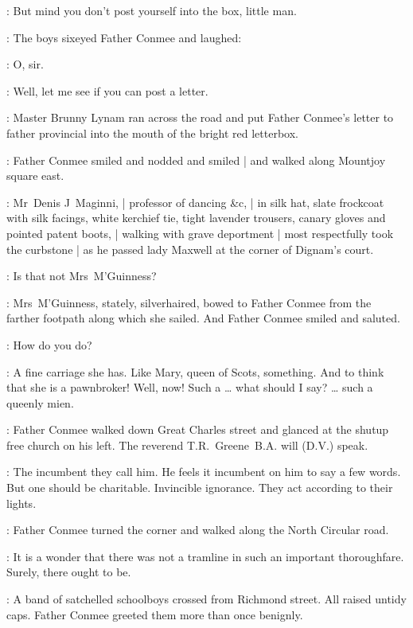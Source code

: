 \conmee:
But mind you don't post yourself into the box, little man.

:
The boys sixeyed Father Conmee and laughed:

\Boys:
O, sir.%

\conmee:
Well, let me see if you can post a letter.

:
Master Brunny Lynam ran across the road
and put Father Conmee's letter to father provincial
into the mouth of the bright red letterbox.

:
Father Conmee smiled and nodded and smiled |
and walked along Mountjoy square east.

\begin{interject}
    :
    Mr~Denis J~Maginni, |
    professor of dancing \&c, |
    in silk hat,
    slate frockcoat with silk facings,
    white kerchief tie,
    tight lavender trousers,
    canary gloves
    and pointed patent boots, |
    walking with grave deportment |
    most respectfully took the curbstone |
    as he passed lady Maxwell
    at the corner of Dignam's court.
\end{interject}%

\conmeeint:
Is that not Mrs~M'Guinness?

:
Mrs~M'Guinness,
stately, silverhaired,
bowed to Father Conmee from the farther footpath
along which she sailed.
And Father Conmee smiled and saluted.

\conmee:
How do you do?

\conmeeint:
A fine carriage she has.
Like Mary, queen of Scots, something.
And to think that she is a pawnbroker!
Well, now!
Such a \ldots
what should I say? \ldots
such a queenly mien.

:
Father Conmee walked down Great Charles street
and glanced at the shutup free church on his left.
The reverend T.R.~Greene~B.A. will (D.V.) speak.

\conmeeint:
The incumbent they call him.%
He feels it incumbent on him to say a few words.
But one should be charitable.
Invincible ignorance.
They act according to their lights.

:
Father Conmee turned the corner
and walked along the North Circular road.

\conmeeint:
It is a wonder that there was not a tramline
in such an important thoroughfare.
Surely, there ought to be.

:
A band of satchelled schoolboys crossed from Richmond street.
All raised untidy caps.
Father Conmee greeted them more than once benignly.

